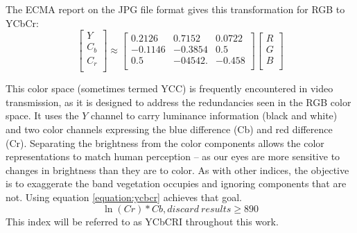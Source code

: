 \documentclass[letterpaper]{report}
\begin{document}
{The ECMA report on the JPG file format gives this transformation for RGB to YCbCr:
\nocite{Ecma2019-yo}
\begin{equation}
	\begin{bmatrix}
	Y \\[0.3em]
	C_b \\[0.3em]
	C_r \\[0.3em]
	\end{bmatrix}
	\approx
	\begin{bmatrix}
	0.2126 & 0.7152 & 0.0722 \\[0.3em]
	-0.1146 & -0.3854 & 0.5 \\[0.3em]
	0.5 & -04542. & -0.458 \\[0.3em]
	\end{bmatrix}
	\begin{bmatrix}
	R \\[0.3em]
	G \\[0.3em]
	B \\[0.3em]
	\end{bmatrix}	
\end{equation}

This color space (sometimes termed YCC) is frequently encountered in video transmission, as it is designed to address the redundancies seen in the RGB color space. It uses the $Y$ channel to carry luminance information (black and white) and two color channels expressing the blue difference (Cb) and red difference (Cr). Separating the brightness from the color components allows the color representations to match human perception -- as our eyes are more sensitive to changes in brightness than they are to color. As with other indices, the objective is to exaggerate the band vegetation occupies and ignoring components that are not. Using equation \ref{equation:ycbcr} achieves that goal.
\begin{equation}\label{eqn:ycbcr-index}
	\ln(Cr) * Cb, discard\ results\geq 890
\end{equation}
This index will be referred to as YCbCRI throughout this work.

}
\end{document}
